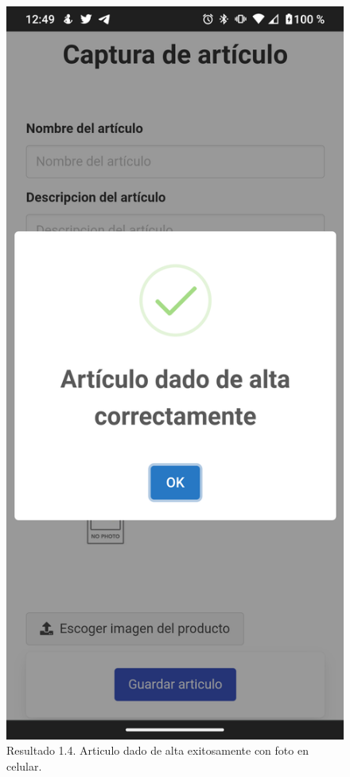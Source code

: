 \documentclass[11pt]{article}
\begin{document}
		\begin{figure}[H]
			\centering
			\includegraphics[scale=0.27]{resources/Screenshot_20211113-004916.png}
			\caption{Resultado 1.4. Articulo dado de alta exitosamente con foto en celular.}\label{fig:picture}
		\end{figure}
\end{document}
